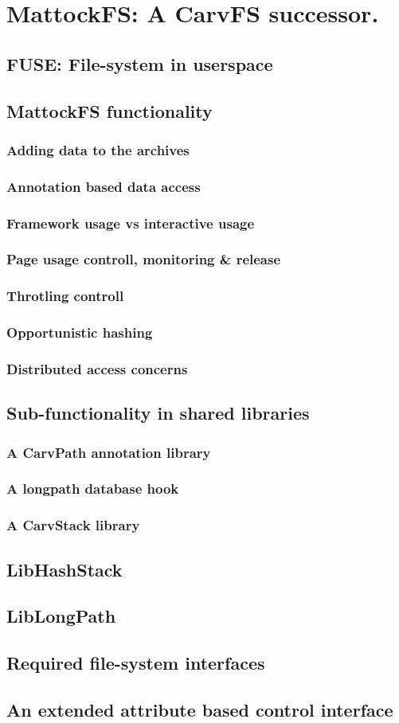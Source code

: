 \chapter{MattockFS: A CarvFS successor.}
\section{FUSE: File-system in userspace}
\section{MattockFS functionality}
\subsection{Adding data to the archives}
\subsection{Annotation based data access}
\subsection{Framework usage vs interactive usage}
\subsection{Page usage controll, monitoring \& release}
\subsection{Throtling controll}
\subsection{Opportunistic hashing}
\subsection{Distributed access concerns}
\section{Sub-functionality in shared libraries}
\subsection{A CarvPath annotation library}
\subsection{A longpath database hook}
\subsection{A CarvStack library}
\section{LibHashStack}
\section{LibLongPath}
\section{Required file-system interfaces}
\section{An extended attribute based control interface}
